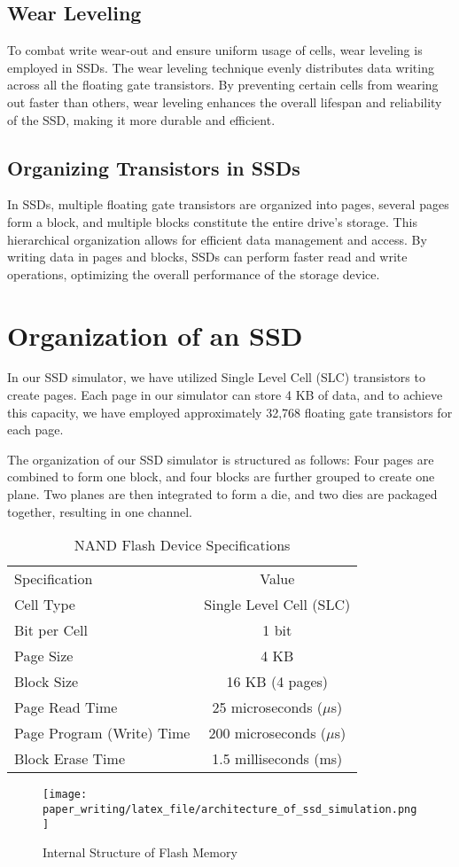 \documentclass[conference]{paper_writing/latex_file/IEEEtran}
\begin{document}
\subsection{Wear Leveling}
To combat write wear-out and ensure uniform usage of cells, wear leveling is employed in SSDs. The wear leveling technique evenly distributes data writing across all the floating gate transistors. By preventing certain cells from wearing out faster than others, wear leveling enhances the overall lifespan and reliability of the SSD, making it more durable and efficient.

\subsection{Organizing Transistors in SSDs}
In SSDs, multiple floating gate transistors are organized into pages, several pages form a block, and multiple blocks constitute the entire drive's storage. This hierarchical organization allows for efficient data management and access. By writing data in pages and blocks, SSDs can perform faster read and write operations, optimizing the overall performance of the storage device.


\section{Organization of an SSD}
In our SSD simulator, we have utilized Single Level Cell (SLC) transistors to create pages. Each page in our simulator can store 4 KB of data, and to achieve this capacity, we have employed approximately 32,768 floating gate transistors for each page.

The organization of our SSD simulator is structured as follows: Four pages are combined to form one block, and four blocks are further grouped to create one plane. Two planes are then integrated to form a die, and two dies are packaged together, resulting in one channel.

\begin{table}[htbp]
    \centering
    \caption{NAND Flash Device Specifications}
    \begin{tabular}{l c}
        Specification & Value \\
        Cell Type & Single Level Cell (SLC) \\
        Bit per Cell & 1 bit \\
        Page Size & 4 KB \\
        Block Size & 16 KB (4 pages) \\
        Page Read Time & 25 microseconds ($\mu$s) \\
        Page Program (Write) Time & 200 microseconds ($\mu$s) \\
        Block Erase Time & 1.5 milliseconds (ms) \\
    \end{tabular}
\end{table}
\begin{figure}[h]
    \centering
    \texttt{[image: paper\_writing/latex\_file/architecture\_of\_ssd\_simulation.png]}
    \caption{Internal Structure of Flash Memory}
    \label{fig:architecture_of_ssd_simulation}
\end{figure}
\end{document}
